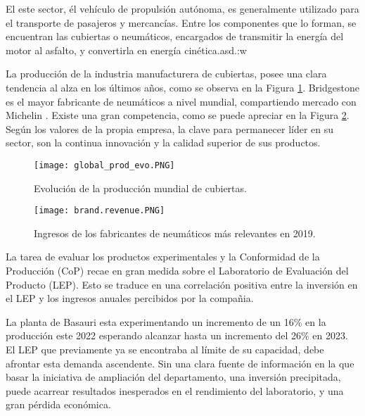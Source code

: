 El  este sector, él vehículo de propulsión autónoma, es generalmente utilizado para el transporte de pasajeros y mercancías. Entre los componentes que lo forman, se encuentran las cubiertas o neumáticos, encargados de transmitir la energía del motor al asfalto, y convertirla en energía cinética.asd.:w


La producción de la industria manufacturera de cubiertas, posee una clara tendencia al alza en los últimos años, como se observa en la Figura \ref{fig:global_prod_evo}. Bridgestone es el mayor fabricante de neumáticos a nivel mundial, compartiendo mercado con Michelin \citep{rodgers2020tire}.  Existe una gran competencia, como se puede apreciar en la Figura \ref{fig:brand_revenue}. Según los valores de la propia empresa, la clave para permanecer líder en su sector, son la continua innovación y la calidad superior de sus productos.

\begin{figure}[h]
    \begin{center}
        \texttt{[image: global\_prod\_evo.PNG]}    
    \end{center}
    \caption{Evolución de la producción mundial de cubiertas.}
    \label{fig:global_prod_evo}
\end{figure}

\begin{figure}[h]
    \begin{center}
        \texttt{[image: brand.revenue.PNG]}    
    \end{center}
    \caption{Ingresos de los fabricantes de neumáticos más relevantes en 2019.}
    \label{fig:brand_revenue}
\end{figure}

La tarea de evaluar los productos experimentales y la Conformidad de la Producción (CoP) recae en gran medida sobre el Laboratorio de Evaluación del Producto (LEP). Esto se traduce en una correlación positiva entre la inversión en el LEP y los ingresos anuales percibidos por la compañia.

La planta de Basauri esta experimentando un incremento de un 16\% en la producción este 2022 esperando alcanzar hasta un incremento del 26\% en 2023. El LEP que previamente ya se encontraba al límite de su capacidad, debe afrontar esta demanda ascendente. Sin una clara fuente de información en la que basar la iniciativa de ampliación del departamento, una inversión precipitada, puede acarrear resultados inesperados en el rendimiento del laboratorio, y una gran pérdida económica.

